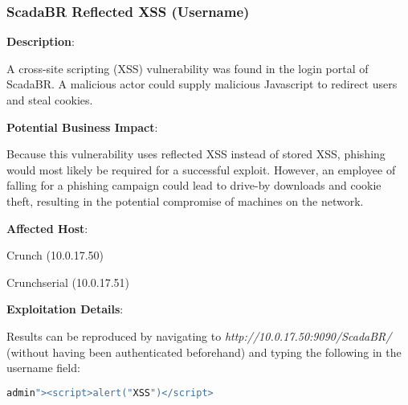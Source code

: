 \subsubsection{ScadaBR Reflected XSS (Username)}
    \label{sec:scadabr_xss_1_username}
    \noindent
    
    
    \noindent
    
    
    \color{black}{}
    \textbf{Description}:
    
    A cross-site scripting (XSS) vulnerability was found in the login portal of ScadaBR.  A malicious actor could supply malicious Javascript to redirect users and steal cookies.  
    
    
    \noindent
    \textbf{Potential Business Impact}:
    
    Because this vulnerability uses reflected XSS instead of stored XSS, phishing would most likely be required for a successful exploit.  However, an employee of \cptc falling for a phishing campaign could lead to drive-by downloads and cookie theft, resulting in the potential compromise of machines on the network.
    
    \noindent
    \textbf{Affected Host}:
    
    Crunch (10.0.17.50)
    
    Crunchserial (10.0.17.51)
    
    \noindent
    \textbf{Exploitation Details}:
    
    Results can be reproduced by navigating to \textit{http://10.0.17.50:9090/ScadaBR/} (without having been authenticated beforehand) and typing the following in the username field:
    
\begin{lstlisting}[language=bash,frame=single,showstringspaces=false]
admin"><script>alert("XSS")</script>
\end{lstlisting}

